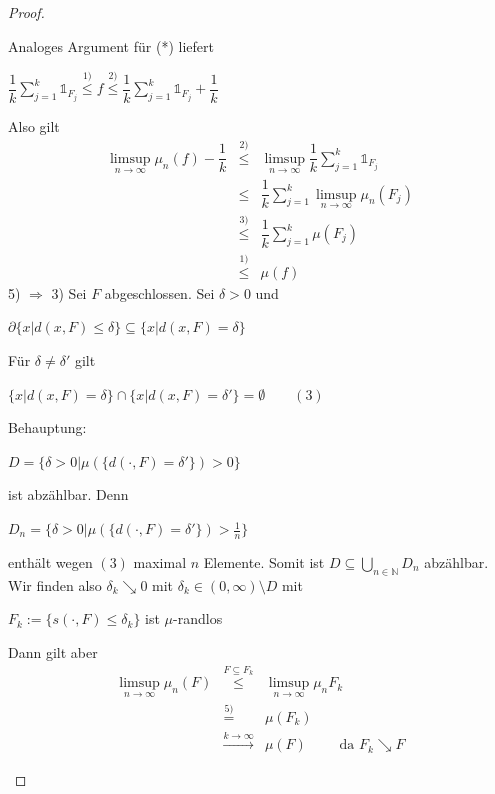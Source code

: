 \documentclass[10pt,a4paper]{report}
\newcommand{\N}{\mathbb{N}}
\numberwithin{equation}{section}
\numberwithin{figure}{section}
\theoremstyle{plain}
\theoremstyle{definition}
\theoremstyle{remark}
\theoremstyle{plain}
\newcommand{\1}{ \mathbb{1} } %
\begin{document}
\begin{proof}
\begin{itemize}
    Analoges Argument für (*) liefert
    \begin{center}
      $ \dfrac{1}{k}\sum\limits_{j=1}^k \1_{F_j} \overset{1)}{\leq} f
      \overset{2)}{\leq}\dfrac{1}{k}\sum\limits_{j=1}^k
      \1_{F_j}+\dfrac{1}{k}$
    \end{center}
    Also gilt
    \begin{eqnarray*}
      \limsup\limits_{n \to \infty} \mu_n(f)-\dfrac{1}{k}&\overset{2)}{\leq}& \limsup\limits_{n \to \infty} \dfrac{1}{k} \sum\limits_{j=1}^k \1_{F_j}\\
      &\leq & \dfrac{1}{k} \sum\limits_{j=1}^k \limsup\limits_{n \to \infty} \mu_n(F_j)\\
      &\overset{3)}{\leq}& \dfrac{1}{k} \sum\limits_{j=1}^k\mu(F_j)\\
      &\overset{1)}{\leq}& \mu(f)
    \end{eqnarray*}
    5) $\Rightarrow$ 3) Sei $F$ abgeschlossen. Sei $\delta > 0$ und
    \begin{center}
      $\partial\{x|d(x,F)\leq \delta\} \subseteq \{x|d(x,F)=\delta\}$
    \end{center}
    Für $\delta\neq \delta'$ gilt
    \begin{center}
      $\{x|d(x,F)=\delta\}\cap \{x|d(x,F)=\delta'\}=\emptyset \qquad
      (3)$
    \end{center}
    Behauptung:
    \begin{center}
      $D=\{\delta > 0|\mu(\{d(\cdot,F)=\delta'\})>0\}$
    \end{center}
    ist abzählbar. Denn
    \begin{center}
      $D_n=\{\delta > 0|\mu(\{d(\cdot,F)=\delta'\})>\frac{1}{n}\}$
    \end{center}
    enthält wegen $(3)$ maximal $n$ Elemente. Somit ist $D \subseteq \bigcup\limits_{n \in \N} D_n$ abzählbar. \\
    Wir finden also $\delta_k \searrow 0$ mit $\delta_k \in
    (0,\infty)\setminus D$ mit
    \begin{center}
      $F_k:=\{s(\cdot,F)\leq \delta_k\}$ ist $\mu$-randlos
    \end{center}
    Dann gilt aber
    \begin{eqnarray*}
      \limsup\limits_{n \to \infty} \mu_n(F)&\overset{F\subseteq F_k}{\leq}& \limsup\limits_{n \to \infty} \mu_n{F_k}\\
      &\overset{5)}{=}&\mu(F_k)\\
      &\overset{k \to \infty}{\to}& \mu(F) \qquad \text{ da } F_k \searrow F 
    \end{eqnarray*}
  \end{itemize}
\end{proof}
\end{document}
